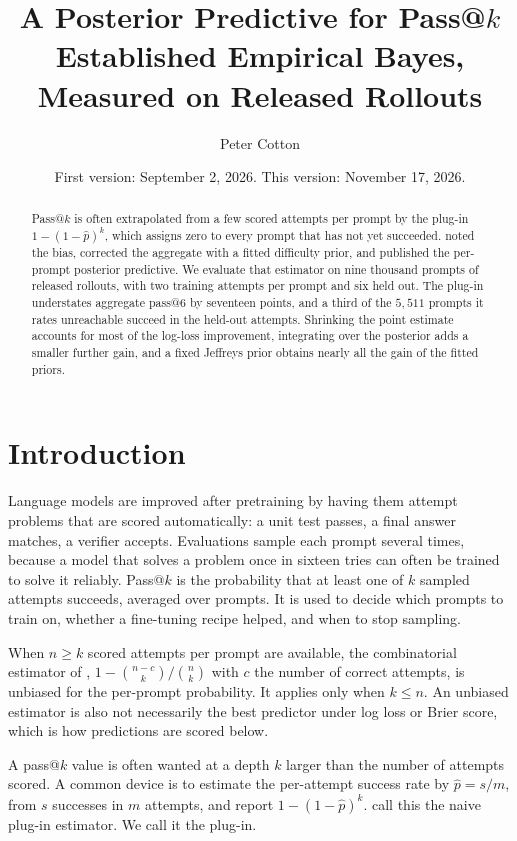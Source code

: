 \documentclass[11pt]{article}
\title{\textbf{A Posterior Predictive for Pass@$k$}\\[0.4em]
\large Established Empirical Bayes, Measured on Released Rollouts}
\author{Peter Cotton}
\date{\normalsize First version: September 2, 2026. This version: November 17, 2026.}
\theoremstyle{itheads}
\begin{document}
\maketitle

\begin{abstract}
\noindent Pass@$k$ is often extrapolated from a few scored attempts
per prompt by the plug-in $1-(1-\hat p)^k$, which assigns zero to
every prompt that has not yet succeeded. \citet{chen2021} noted the
bias, \citet{kazdan2025} corrected the aggregate with a fitted
difficulty prior, and \citet{verine2026} published the per-prompt
posterior predictive. We evaluate that estimator on nine thousand
prompts of released rollouts, with two training attempts per prompt
and six held out. The plug-in understates aggregate pass@6 by
seventeen points, and a third of the $5{,}511$ prompts it rates
unreachable succeed in the held-out attempts. Shrinking the point
estimate accounts for most of the log-loss improvement, integrating
over the posterior adds a smaller further gain, and a fixed Jeffreys
prior obtains nearly all the gain of the fitted priors.
\end{abstract}

\section{Introduction}

Language models are improved after pretraining by having them
attempt problems that are scored automatically: a unit test passes,
a final answer matches, a verifier accepts. Evaluations sample each
prompt several times, because a model that solves a problem once in
sixteen tries can often be trained to solve it reliably. Pass@$k$ is
the probability that at least one of $k$ sampled attempts succeeds,
averaged over prompts. It is used to decide which prompts to train
on, whether a fine-tuning recipe helped, and when to stop sampling.

When $n \ge k$ scored attempts per prompt are available, the
combinatorial estimator of \citet{chen2021},
$1-\binom{n-c}{k}/\binom{n}{k}$ with $c$ the number of correct
attempts, is unbiased for the per-prompt probability. It applies
only when $k \le n$. An unbiased estimator is also not necessarily
the best predictor under log loss or Brier score, which is how
predictions are scored below.

A pass@$k$ value is often wanted at a depth $k$ larger than the
number of attempts scored. A common device is to estimate the
per-attempt success rate by $\hat p = s/m$, from $s$ successes in
$m$ attempts, and report $1-(1-\hat p)^k$. \citet{verine2026} call
this the naive plug-in estimator. We call it the plug-in.
\end{document}
